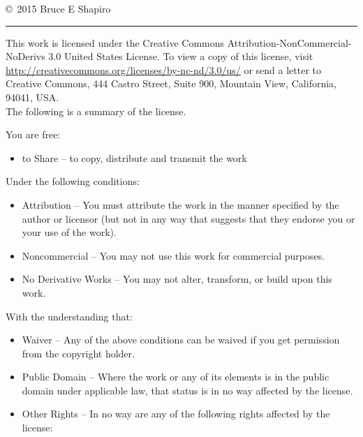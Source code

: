 \copyright \ 2015 Bruce E Shapiro \\ \vspace{-8pt} \hrule
\begin{small}
This work is licensed under the Creative Commons Attribution-NonCommercial-NoDerivs 3.0 United States License. To view a copy of this license, visit \url{http://creativecommons.org/licenses/by-nc-nd/3.0/us/}  or send a letter to Creative Commons, 444 Castro Street, Suite 900, Mountain View, California, 94041, USA.\\
The following is a summary of the license.  

You are free:
\vspace{-12pt}
\begin{itemize}
\item to Share -- to copy, distribute and transmit the work
\end{itemize}
\vspace{-12pt}
Under the following conditions:
\vspace{-12pt}
\begin{itemize}
\setlength{\itemsep}{0pt}
\setlength{\parsep}{0pt}
\setlength{\topsep}{0pt}
\setlength{\parskip}{0pt}
\setlength{\partopsep}{0pt}
\item Attribution -- You must attribute the work in the manner specified by the author or licensor (but not in any way that suggests that they endorse you or your use of the work).
\item Noncommercial -- You may not use this work for commercial purposes.
\item No Derivative Works -- You may not alter, transform, or build upon this work.
\end{itemize}
\vspace{-12pt}
With the understanding that:
\vspace{-12pt}
\begin{itemize}
\setlength{\itemsep}{0pt}
\setlength{\parsep}{0pt}
\setlength{\topsep}{0pt}
\setlength{\parskip}{0pt}
\item Waiver -- Any of the above conditions can be waived if you get permission from the copyright holder.
\item Public Domain -- Where the work or any of its elements is in the public domain under applicable law, that status is in no way affected by the license.
\item Other Rights -- In no way are any of the following rights affected by the license:
\vspace{-4pt}
\begin{itemize}

\end{itemize}
\end{itemize}
\end{small}
